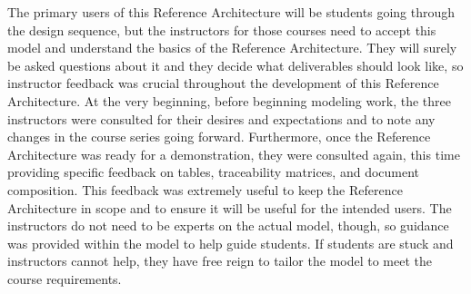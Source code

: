 The primary users of this Reference Architecture will be students going through the design sequence, but the instructors for those courses need to accept this model and understand the basics of the Reference Architecture. They will surely be asked questions about it and they decide what deliverables should look like, so instructor feedback was crucial throughout the development of this Reference Architecture. At the very beginning, before beginning modeling work, the three instructors were consulted for their desires and expectations and to note any changes in the course series going forward. Furthermore, once the Reference Architecture was ready for a demonstration, they were consulted again, this time providing specific feedback on tables, traceability matrices, and document composition. This feedback was extremely useful to keep the Reference Architecture in scope and to ensure it will be useful for the intended users. The instructors do not need to be experts on the actual model, though, so guidance was provided within the model to help guide students. If students are stuck and instructors cannot help, they have free reign to tailor the model to meet the course requirements.